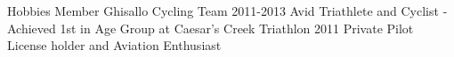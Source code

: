 \begin{category}{Hobbies}
\citembullet Member Ghisallo Cycling Team 2011-2013
\citembullet Avid Triathlete and Cyclist - Achieved 1st in Age Group at Caesar's Creek Triathlon 2011
\citembullet Private Pilot License holder and Aviation Enthusiast 
\end{category}
